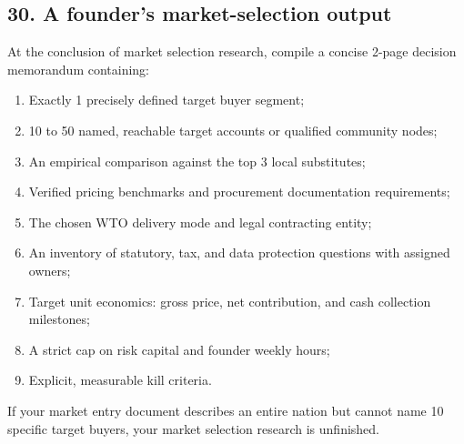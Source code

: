 \subsection{30. A founder's market-selection output}

At the conclusion of market selection research, compile a concise 2-page decision memorandum containing:
\begin{enumerate}
    \item Exactly 1 precisely defined target buyer segment;
    \item 10 to 50 named, reachable target accounts or qualified community nodes;
    \item An empirical comparison against the top 3 local substitutes;
    \item Verified pricing benchmarks and procurement documentation requirements;
    \item The chosen WTO delivery mode and legal contracting entity;
    \item An inventory of statutory, tax, and data protection questions with assigned owners;
    \item Target unit economics: gross price, net contribution, and cash collection milestones;
    \item A strict cap on risk capital and founder weekly hours;
    \item Explicit, measurable kill criteria.
\end{enumerate}
If your market entry document describes an entire nation but cannot name 10 specific target buyers, your market selection research is unfinished.
